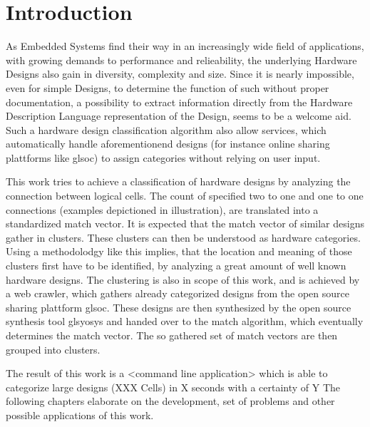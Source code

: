 
\section{Introduction}
As Embedded Systems find their way in an increasingly wide field of applications,
with growing demands to performance and relieability, the underlying Hardware 
Designs also gain in diversity, complexity and size. Since it is nearly impossible,
even for simple Designs, to determine the function of such without proper
documentation, a possibility to extract information directly from the Hardware 
Description Language representation of the Design, seems to be a welcome aid.
Such a hardware design classification algorithm also allow services, which 
automatically handle aforementionend designs (for instance online sharing 
plattforms like gls{oc}) to assign categories without relying on user input.

This work tries to achieve a classification of hardware designs by analyzing the 
connection between logical cells. The count of specified two to one and one to 
one connections (examples depictioned in illustration), are translated into a
standardized match vector. It is expected that the match vector of similar designs
gather in clusters. These clusters can then be understood as hardware categories. 
Using a methodolodgy like this implies, that the location and meaning of those clusters first 
have to be identified, by analyzing a great amount of well known hardware designs.
The clustering is also in scope of this work, and is achieved by a web crawler,
which gathers already categorized designs from the open source sharing plattform 
gls{oc}. These designs are then synthesized by the open source synthesis tool 
gls{yosys} and handed over to the match algorithm, which eventually determines 
the match vector. The so gathered set of match vectors are then grouped into clusters.

The result of this work is a <command line application> which is able to 
categorize large designs (XXX Cells) in X seconds with a certainty of Y%
The following chapters elaborate on the development, set of problems and 
other possible applications of this work. 
  
